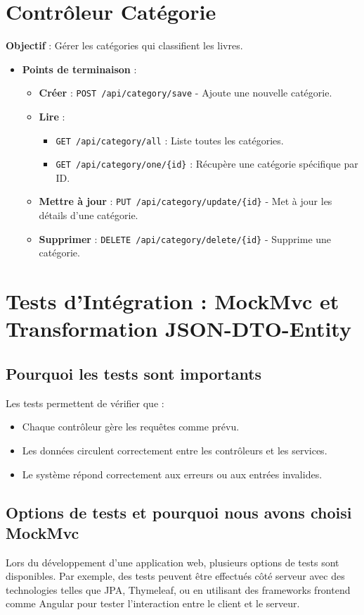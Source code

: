 \documentclass[a4paper,12pt]{article}
\begin{document}
\section{Contrôleur Catégorie}
\textbf{Objectif} : Gérer les catégories qui classifient les livres.
\begin{itemize}
    \item \textbf{Points de terminaison} :
    \begin{itemize}
        \item \textbf{Créer} : \texttt{POST /api/category/save} - Ajoute une nouvelle catégorie.
        \item \textbf{Lire} :
        \begin{itemize}
            \item \texttt{GET /api/category/all} : Liste toutes les catégories.
            \item \texttt{GET /api/category/one/\{id\}} : Récupère une catégorie spécifique par ID.
        \end{itemize}
        \item \textbf{Mettre à jour} : \texttt{PUT /api/category/update/\{id\}} - Met à jour les détails d'une catégorie.
        \item \textbf{Supprimer} : \texttt{DELETE /api/category/delete/\{id\}} - Supprime une catégorie.
    \end{itemize}
\end{itemize}

\section{Tests d'Intégration : MockMvc et Transformation JSON-DTO-Entity}

\subsection{Pourquoi les tests sont importants}
Les tests permettent de vérifier que :
\begin{itemize}
    \item Chaque contrôleur gère les requêtes comme prévu.
    \item Les données circulent correctement entre les contrôleurs et les services.
    \item Le système répond correctement aux erreurs ou aux entrées invalides.
\end{itemize}

\subsection{Options de tests et pourquoi nous avons choisi MockMvc}
Lors du développement d'une application web, plusieurs options de tests sont disponibles. Par exemple, des tests peuvent être effectués côté serveur avec des technologies telles que JPA, Thymeleaf, ou en utilisant des frameworks frontend comme Angular pour tester l'interaction entre le client et le serveur.
\end{document}
